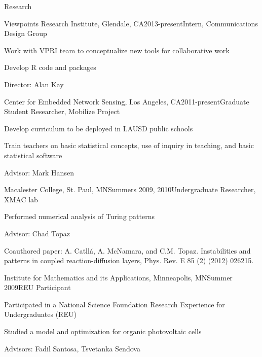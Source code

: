 \documentclass{resume} %
\begin{document}
\begin{rSection}{Research}

\begin{rSubsection}{Viewpoints Research Institute, }{Glendale, CA}{2013-present}{Intern, Communications Design Group}
\item Work with VPRI team to conceptualize new tools for collaborative work
\item Develop R code and packages
\item Director: Alan Kay
\end{rSubsection}


\begin{rSubsection}{Center for Embedded Network Sensing, }{Los Angeles, CA}{2011-present}{Graduate Student Researcher, Mobilize Project}
\item Develop curriculum to be deployed in LAUSD public schools
\item Train teachers on basic statistical concepts, use of inquiry in teaching, and basic statistical software
\item Advisor: Mark Hansen
\end{rSubsection}


\begin{rSubsection}{Macalester College, }{St. Paul, MN}{Summers 2009, 2010}{Undergraduate Researcher, XMAC lab}
\item Performed numerical analysis of Turing patterns
\item Advisor: Chad Topaz
\item Coauthored paper: A. Catll{\'a}, A. McNamara, and C.M. Topaz. Instabilities and patterns in coupled reaction-diffusion layers, Phys. Rev. E 85 (2) (2012) 026215.
\end{rSubsection}


\begin{rSubsection}{Institute for Mathematics and its Applications, }{Minneapolis, MN}{Summer 2009}{REU Participant}
\item Participated in a National Science Foundation Research Experience for Undergraduates (REU)
\item Studied a model and optimization for organic photovoltaic cells
\item Advisors: Fadil Santosa, Tsvetanka Sendova
\end{rSubsection}

\end{rSection}
\end{document}
